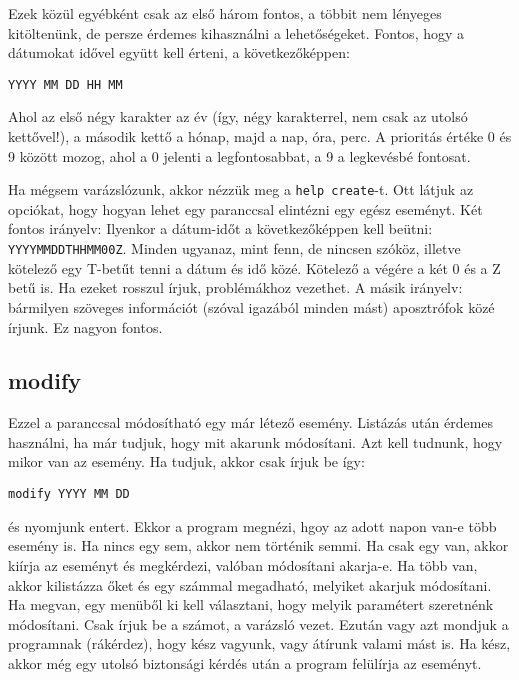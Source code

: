 \documentclass[a4paper]{article}
\begin{document}
Ezek közül egyébként csak az első három fontos, a többit nem lényeges kitöltenünk, de persze érdemes kihasználni a lehetőségeket. Fontos, hogy a dátumokat idővel együtt kell érteni, a következőképpen:

\begin{center}
	\texttt{YYYY MM DD HH MM}
\end{center}

Ahol az első négy karakter az év (így, négy karakterrel, nem csak az utolsó kettővel!), a második kettő a hónap, majd a nap, óra, perc. A prioritás értéke 0 és 9 között mozog, ahol a 0 jelenti a legfontosabbat, a 9 a legkevésbé fontosat.

Ha mégsem varázslózunk, akkor nézzük meg a \texttt{help create}-t. Ott látjuk az opciókat, hogy hogyan lehet egy paranccsal elintézni egy egész eseményt. Két fontos irányelv: Ilyenkor a dátum-időt a következőképpen kell beütni: \texttt{YYYYMMDDTHHMM00Z}. Minden ugyanaz, mint fenn, de nincsen szóköz, illetve kötelező egy T-betűt tenni a dátum és idő közé. Kötelező a végére a két 0 és a Z betű is. Ha ezeket rosszul írjuk, problémákhoz vezethet. A másik irányelv: bármilyen szöveges információt (szóval igazából minden mást) aposztrófok közé írjunk. Ez nagyon fontos.

\subsection{modify}

Ezzel a paranccsal módosítható egy már létező esemény. Listázás után érdemes használni, ha már tudjuk, hogy mit akarunk módosítani. Azt kell tudnunk, hogy mikor van az esemény. Ha tudjuk, akkor csak írjuk be így:

\begin{center}
	\texttt{modify YYYY MM DD}
\end{center}

és nyomjunk entert. Ekkor a program megnézi, hgoy az adott napon van-e több esemény is. Ha nincs egy sem, akkor nem történik semmi. Ha csak egy van, akkor kiírja az eseményt és megkérdezi, valóban módosítani akarja-e. Ha több van, akkor kilistázza őket és egy számmal megadható, melyiket akarjuk módosítani. Ha megvan, egy menüből ki kell választani, hogy melyik paramétert szeretnénk módosítani. Csak írjuk be a számot, a varázsló vezet. Ezután vagy azt mondjuk a programnak (rákérdez), hogy kész vagyunk, vagy átírunk valami mást is. Ha kész, akkor még egy utolsó biztonsági kérdés után a program felülírja az eseményt.
\end{document}
